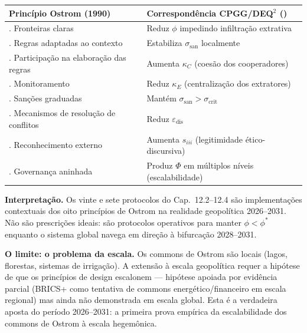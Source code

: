 {\def\LTcaptype{none}
{\small\begin{longtable}[]{@{}
  >{\raggedright\arraybackslash}p{}
  >{\raggedright\arraybackslash}p{}@{}}
\toprule\noalign{}
\begin{minipage}[b]{\linewidth}\raggedright
Princ\'{i}pio Ostrom (1990)
\end{minipage} & \begin{minipage}[b]{\linewidth}\raggedright
Correspond\^{e}ncia CPGG/DEQ$^2$ (\Hypoth{})
\end{minipage} \\
\midrule\noalign{}
\endhead
\bottomrule\noalign{}
\endlastfoot
1. Fronteiras claras & Reduz $\phi$ impedindo infiltra\c{c}\~{a}o extrativa \\
2. Regras adaptadas ao contexto & Estabiliza $\sigma_{\text{san}}$ localmente \\
3. Participa\c{c}\~{a}o na elabora\c{c}\~{a}o das regras & Aumenta $\kappa_C$ (coes\~{a}o dos cooperadores) \\
4. Monitoramento & Reduz $\kappa_E$ (centraliza\c{c}\~{a}o dos extratores) \\
5. San\c{c}\~{o}es graduadas & Mant\'{e}m $\sigma_{\text{san}} > \sigma_{\text{crit}}$ \\
6. Mecanismos de resolu\c{c}\~{a}o de conflitos & Reduz $\varepsilon_{\text{dis}}$ \\
7. Reconhecimento externo & Aumenta $s_{iii}$ (legitimidade \'{e}tico-discursiva) \\
8. Governan\c{c}a aninhada & Produz $\Phi$ em m\'{u}ltiplos n\'{i}veis (escalabilidade) \\
\end{longtable}}
}

\Proved{} \textbf{Interpreta\c{c}\~{a}o.} Os vinte e sete protocolos
do Cap.~12.2--12.4 s\~{a}o implementa\c{c}\~{o}es contextuais dos oito
princ\'{i}pios de Ostrom na realidade geopol\'{i}tica 2026--2031. N\~{a}o
s\~{a}o prescri\c{c}\~{o}es ideais: s\~{a}o protocolos operativos para
manter $\phi < \phi^*$ enquanto o sistema global navega em dire\c{c}\~{a}o
\`{a} bifurca\c{c}\~{a}o 2028--2031.

\Hypoth{} \textbf{O limite: o problema da escala.} Os commons de Ostrom
s\~{a}o locais (lagos, florestas, sistemas de irriga\c{c}\~{a}o). A
extens\~{a}o \`{a} escala geopol\'{i}tica requer a hip\'{o}tese de que
os princ\'{i}pios de design escalonem --- hip\'{o}tese apoiada por
evid\^{e}ncia parcial (BRICS+ como tentativa de commons
energ\'{e}tico/financeiro em escala regional) mas ainda n\~{a}o demonstrada
em escala global. Esta \'{e} a verdadeira aposta do per\'{i}odo
2026--2031: a primeira prova emp\'{i}rica da escalabilidade dos commons
de Ostrom \`{a} escala hegem\^{o}nica.



